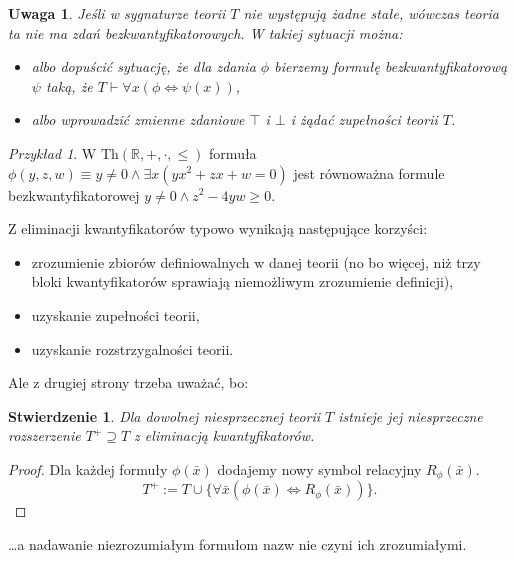 \documentclass{article}
\newcommand{\R}{\mathbb{R}}
\theoremstyle{plain}
\newtheorem{stw}[thm]{Stwierdzenie}
\newtheorem{uw}[thm]{Uwaga}
\theoremstyle{definition}
\theoremstyle{remark}
\newtheorem{prz}[thm]{Przykład}
\newcommand{\Th}{\text{Th}}
\begin{document}
\begin{uw}
	Jeśli w sygnaturze teorii $T$ nie występują żadne stałe, wówczas teoria
	ta nie ma zdań bezkwantyfikatorowych.  W takiej sytuacji można:
	\begin{itemize}
		\item albo dopuścić sytuację, że dla zdania $\phi$ bierzemy
			formułę bezkwantyfikatorową $\psi$ taką, że $T \vdash
			\forall x (\phi \iff \psi(x))$,
		\item albo wprowadzić zmienne zdaniowe $\top$ i $\bot$ i żądać
			zupełności teorii $T$.
	\end{itemize}
\end{uw}

\begin{prz}
	W $\Th(\R, +, \cdot, \leq)$ formuła $\phi(y, z, w) \equiv y \neq 0
	\wedge \exists x (yx^2 + zx + w = 0)$ jest równoważna formule
	bezkwantyfikatorowej $y \neq 0 \wedge z^2 - 4yw \geq 0$.
\end{prz}

Z eliminacji kwantyfikatorów typowo wynikają następujące korzyści:
\begin{itemize}
	\item zrozumienie zbiorów definiowalnych w danej teorii (no bo więcej,
		niż trzy bloki kwantyfikatorów sprawiają niemożliwym
		zrozumienie definicji),
	\item uzyskanie zupełności teorii,
	\item uzyskanie rozstrzygalności teorii.
\end{itemize}

Ale z drugiej strony trzeba uważać, bo:

\begin{stw} Dla dowolnej niesprzecznej teorii $T$ istnieje jej niesprzeczne
	rozszerzenie $T^+ \supseteq T$ z eliminacją kwantyfikatorów.
\end{stw}
\begin{proof}
	Dla każdej formuły $\phi(\bar{x})$ dodajemy nowy symbol relacyjny
	$R_{\phi}(\bar{x}).$
	\[T^+ := T \cup \{\forall \bar{x} (\phi(\bar{x}) \iff
	R_{\phi}(\bar{x}))\}.\]
\end{proof}
\ldots a nadawanie niezrozumiałym formułom nazw nie czyni ich zrozumiałymi.
\end{document}
